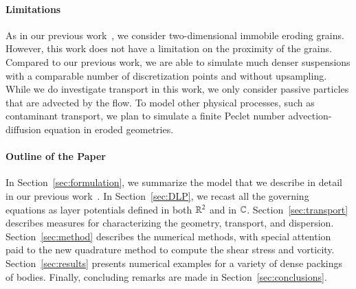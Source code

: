 \documentclass[preprint,10pt]{elsarticle}
\begin{document}
\paragraph{Limitations}
As in our previous work~\cite{qua-moo2018}, we consider two-dimensional
immobile eroding grains. However, this work does not have a limitation
on the proximity of the grains. Compared to our previous work, we are
able to simulate much denser suspensions with a comparable number of
discretization points and without upsampling.  While we do investigate
transport in this work, we only consider passive particles that are
advected by the flow.  To model other physical processes, such as
contaminant transport, we plan to simulate a finite Peclet number
advection-diffusion equation in eroded geometries.


\paragraph{Outline of the Paper}
In Section~\ref{sec:formulation}, we summarize the model that we
describe in detail in our previous work~\cite{qua-moo2018}.  In
Section~\ref{sec:DLP}, we recast all the governing equations as layer
potentials defined in both ${\mathbb{R}}^2$ and in ${\mathbb{C}}$.
Section~\ref{sec:transport} describes measures for characterizing the
geometry, transport, and dispersion. Section~\ref{sec:method} describes
the numerical methods, with special attention paid to the new quadrature
method to compute the shear stress and vorticity.
Section~\ref{sec:results} presents numerical examples for a variety of
dense packings of bodies.  Finally, concluding remarks are made in
Section~\ref{sec:conclusions}.

\end{document}
